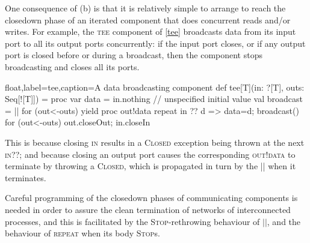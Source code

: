 \documentclass[12pt]{IOS-Book-Article-CPA-2017}
\begin{document}
One consequence of (b) is that it is relatively simple to arrange
to reach the closedown phase of an iterated component that does
concurrent reads and/or writes. 
%
For example, the \textsc{tee} component of \Listing \ref{tee} broadcasts
data from its input port to all its output ports concurrently: if
the input port closes, or if any output port is closed 
before or during a broadcast, then the component stops
broadcasting and closes all its ports.

\begin{code+}[...]{float,label=tee,caption={A data broadcasting component}}
   def tee[T](in: ?[T], outs: Seq[![T]]) =
   proc { var data      = in.nothing  // unspecified initial value
          val broadcast = || for (out<-outs) yield proc { out!data }
          repeat { in ?? { d => { data=d;  broadcast() }}}
          for (out<-outs) out.closeOut; in.closeIn
        }
\end{code+}

This is because closing \textsc{in} results in a \textsc{Closed} exception 
being thrown at the next \textsc{in??}; and because closing an
output port causes the corresponding \textsc{out!data} to 
terminate by throwing a \textsc{Closed}, which is
propagated in turn by the \textsc{||} when it terminates.

Careful programming of the closedown phases of communicating components
is needed in order to assure the clean termination of networks
of interconnected processes, and this is facilitated by the \textsc{Stop}-rethrowing behaviour
of $||$, and the behaviour of \textsc{repeat} when its body \textsc{Stop}s.
\end{document}
